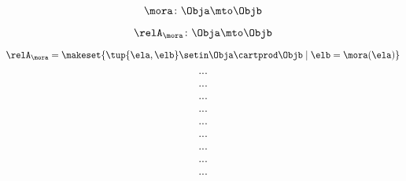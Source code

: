 \begin{forslides}
     \begin{equation}
        \label{eq:slides_trace_monoidal_37}
      \mora \colon \Obja \mto \Objb
    \end{equation}
    
     \begin{equation}
        \label{eq:slides_trace_monoidal_38}
       \relA_\mora \colon \Obja \mto \Objb
    \end{equation}
    
    \begin{equation}
        \label{eq:slides_trace_monoidal_39}
       \relA_\mora = \makeset{ \tup{\ela, \elb} \setin \Obja \cartprod \Objb \mid \elb = \mora(\ela)}
    \end{equation}
    
     \begin{equation}
        \label{eq:slides_trace_monoidal_40}
       ...
    \end{equation}
    
     \begin{equation}
        \label{eq:slides_trace_monoidal_41}
       ...
    \end{equation}
    
     \begin{equation}
        \label{eq:slides_trace_monoidal_42}
       ...
    \end{equation}
    
     \begin{equation}
        \label{eq:slides_trace_monoidal_43}
       ...
    \end{equation}
    
     \begin{equation}
        \label{eq:slides_trace_monoidal_44}
       ...
    \end{equation}
    
     \begin{equation}
        \label{eq:slides_trace_monoidal_45}
       ...
    \end{equation}
    
    \begin{equation}
        \label{eq:slides_trace_monoidal_46}
       ...
    \end{equation}
    
     \begin{equation}
        \label{eq:slides_trace_monoidal_47}
       ...
    \end{equation}
    
     \begin{equation}
        \label{eq:slides_trace_monoidal_48}
       ...
    \end{equation}
    

\end{forslides}
